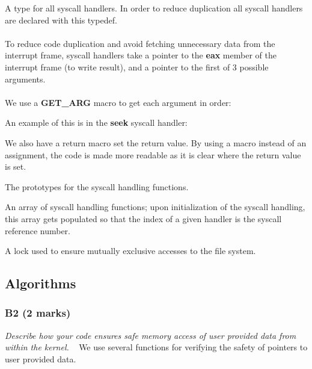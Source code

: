 \documentclass{report}
\newcommand{\question}[1]{\textit{#1} \ }
\newcommand{\fun}[1]{\textcolor{Emerald}{\textbf{#1}}}
\newcommand{\file}[1]{\textcolor{YellowGreen}{\textbf{#1}}}
\newcommand{\var}[1]{\textcolor{RoyalPurple}{\textbf{#1}}}
\newcommand{\const}[1]{\textcolor{BrickRed}{\textbf{#1}}}
\newcommand{\pintoscode}[4]{}
\newcommand{\pintosfile}[3]{\pintoscode{#1}{#2}{\file{#3}}{#3}}
\begin{document}
                
                \pintosfile{30}{30}{syscall.c}
                A type for all syscall handlers. In order to reduce duplication all syscall handlers are declared with this typedef.
                \\
                \\ To reduce code duplication and avoid fetching unnecessary data from the interrupt frame, syscall handlers take 
                a pointer to the \var{eax} member of the interrupt frame (to write result), and a pointer to the first of 3 possible arguments.
                \\
                \\ We use a \const{GET\_ARG} macro to get each argument in order:
                \pintosfile{19}{24}{syscall.c}

                An example of this is in the \fun{seek} syscall handler:
                \pintosfile{426}{429}{syscall.c}
                
                We also have a return macro set the return value. By using a macro instead of an assignment, the code is made more readable as it is clear where the return value is set.
                \pintosfile{26}{26}{syscall.c}
                            

                \pintosfile{44}{57}{syscall.c}
                The prototypes for the syscall handling functions.

                \pintosfile{59}{59}{syscall.c}
                An array of syscall handling functions; upon initialization of the syscall handling, this array gets populated so 
                that the index of a given handler is the syscall reference number.

                \pintosfile{6}{6}{syscall.h}
                A lock used to ensure mutually exclusive accesses to the file system.

            
        \subsection*{Algorithms}
            \subsubsection*{B2 (2 marks)}
                \question{Describe how your code ensures safe memory access of user provided data from within the kernel.}
                    We use several functions for verifying the safety of pointers to user provided data.
                    \pintosfile{146}{159}{syscall.c}
\end{document}
